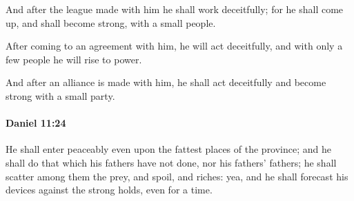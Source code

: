 			\begin{versebox}
					\item[BHS] 
					\item[LXX] 
					\item[ASV] And after the league made with him he shall work deceitfully; for he shall come up, and shall become strong, with a small people.
					\item[NIV] After coming to an agreement with him, he will act deceitfully, and with only a few people he will rise to power.
					\item[NRSV] And after an alliance is made with him, he shall act deceitfully and become strong with a small party.
			\end{versebox}

		\paragraph{Daniel 11:24} %
			\label{DANIEL-11-24}

			He shall enter peaceably even upon the fattest places of the province; and he shall do that which his fathers have not done, nor his fathers’ fathers; he shall scatter among them the prey, and spoil, and riches: yea, and he shall forecast his devices against the strong holds, even for a time.

